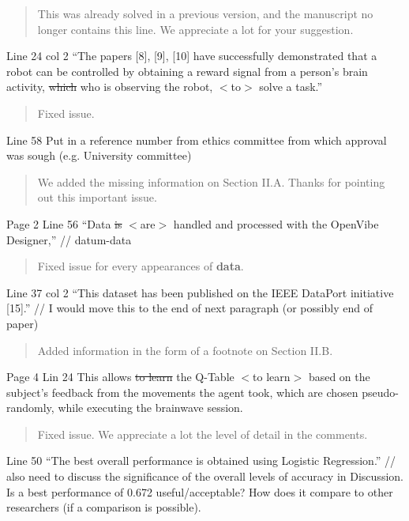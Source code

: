 \documentclass[journal,onecolumn,12pt]{IEEEtran}
\begin{document}
\begin{quotation}
{\color{blue}
This was already solved in a previous version, and the manuscript no longer contains this line.  We appreciate a lot for your suggestion.
}
\end{quotation}

Line 24 col 2 “The papers [8], [9], [10] have successfully demonstrated that a robot can be controlled by obtaining a reward signal from a person’s brain activity, \sout{which} who is observing the robot, $<$to$>$ solve a task.”

\begin{quotation}
{\color{blue}
Fixed issue.
}
\end{quotation}

Line 58 Put in a reference number from ethics committee from which approval was sough (e.g. University committee)

\begin{quotation}
{\color{blue}
We added the missing information on Section II.A.  Thanks for pointing out this important issue.
}
\end{quotation}

Page 2
Line 56 “Data \sout{is} $<$are$>$ handled and processed with the OpenVibe Designer,” // datum-data

\begin{quotation}
{\color{blue}
Fixed issue for every appearances of \textbf{data}.
}
\end{quotation}

Line 37 col 2 “This dataset has been published on the IEEE DataPort initiative [15].” // I would move this to the end of next paragraph (or possibly end of paper)

\begin{quotation}
{\color{blue}
Added information in the form of a footnote on Section II.B.
}
\end{quotation}

Page 4
Lin 24 This allows \sout{to learn} the Q-Table $<$to learn$>$ based on the subject’s feedback from the movements the agent
took, which are chosen pseudo-randomly, while executing the brainwave session.

\begin{quotation}
{\color{blue}
Fixed issue.  We appreciate a lot the level of detail in the comments.
}
\end{quotation}

Line 50 “The best overall performance is obtained using Logistic Regression.” // also need to discuss the significance of the overall levels of accuracy in Discussion. Is a best performance of 0.672 useful/acceptable? How does it compare to other researchers (if a comparison is possible).
\end{document}
